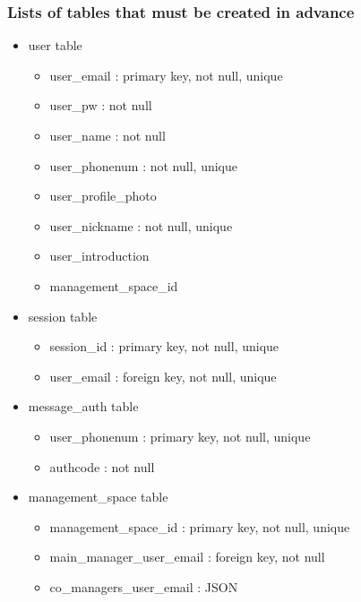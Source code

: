 \documentclass[conference]{IEEEtran}
\begin{document}
\subsubsection{Lists of tables that must be created in advance}
\begin{itemize}
    \item user table
    \begin{itemize}
        \item user\_email : primary key, not null, unique
        \item user\_pw : not null
        \item user\_name : not null
        \item user\_phonenum : not null, unique
        \item user\_profile\_photo
        \item user\_nickname : not null, unique
        \item user\_introduction
        \item management\_space\_id
    \end{itemize}
    \item session table
    \begin{itemize}
        \item session\_id : primary key, not null, unique
        \item user\_email : foreign key, not null, unique
    \end{itemize}
    \item message\_auth table
    \begin{itemize}
        \item user\_phonenum : primary key, not null, unique
        \item authcode : not null
    \end{itemize}
    \item management\_space table
    \begin{itemize}
        \item management\_space\_id : primary key, not null, unique
        \item main\_manager\_user\_email : foreign key, not null
        \item co\_managers\_user\_email : JSON\\
    \end{itemize}
\end{itemize}
\end{document}
